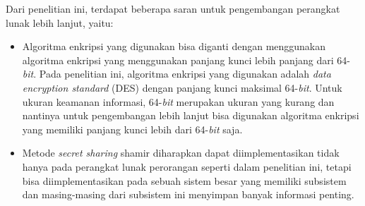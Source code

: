 Dari penelitian ini, terdapat beberapa saran untuk pengembangan perangkat lunak lebih lanjut, yaitu:
\begin{itemize}
	\item Algoritma enkripsi yang digunakan bisa diganti dengan menggunakan algoritma enkripsi yang menggunakan panjang kunci lebih panjang dari 64-\textit{bit}. Pada penelitian ini, algoritma enkripsi yang digunakan adalah \textit{data encryption standard} (DES) dengan panjang kunci maksimal 64-\textit{bit}. Untuk ukuran keamanan informasi, 64-\textit{bit} merupakan ukuran yang kurang dan nantinya untuk pengembangan lebih lanjut bisa digunakan algoritma enkripsi yang memiliki panjang kunci lebih dari 64-\textit{bit} saja.
	\item Metode \textit{secret sharing} shamir diharapkan dapat diimplementasikan tidak hanya pada perangkat lunak perorangan seperti dalam penelitian ini, tetapi bisa diimplementasikan pada sebuah sistem besar yang memiliki subsistem dan masing-masing dari subsistem ini menyimpan banyak informasi penting.
\end{itemize}